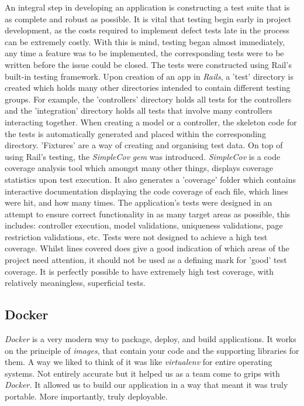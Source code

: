 \documentclass{l3proj}
\begin{document}
An integral step in developing an application is constructing a test suite that is as complete and robust as possible. It is vital that testing begin early in project development, as the costs required to implement defect tests late in the process can be extremely costly. With this is mind, testing began almost immediately, any time a feature was to be implemented, the corresponding tests were to be written before the issue could be closed. The tests were constructed using Rail's built-in testing framework. Upon creation of an app in \textit{Rails}, a 'test' directory is created which holds many other directories intended to contain different testing groups. For example, the 'controllers' directory holds all tests for the controllers and the 'integration' directory holds all tests that involve many controllers interacting together. When creating a model or a controller, the skeleton code for the tests is automatically generated and placed within the corresponding directory. 'Fixtures' are a way of creating and organising test data. On top of using Rail's testing, the \textit{SimpleCov} \textit{gem} was introduced. \textit{SimpleCov} is a code coverage analysis tool which amongst many other things, displays coverage statistics upon test execution. It also generates a 'coverage' folder which contains interactive documentation displaying the code coverage of each file, which lines were hit, and how many times. The application's tests were designed in an attempt to ensure correct functionality in as many target areas as possible, this includes: controller execution, model validations, uniqueness validations, page restriction validations, etc. Tests were not designed to achieve a high test coverage. Whilst lines covered does give a good indication of which areas of the project need attention, it should not be used as a defining mark for 'good' test coverage. It is perfectly possible to have extremely high test coverage, with relatively meaningless, superficial tests.


\subsection{Docker}
\label{sec:docker}

\textit{Docker}\cite{what-is-docker} is a very modern way to package, deploy, and build applications. It works on the principle of \textit{images}, that contain your code and the supporting libraries for them. A way we liked to think of it was like \textit{virtualenv} for entire operating systems. Not entirely accurate but it helped us as a team come to grips with \textit{Docker.} It allowed us to build our application in a way that meant it was truly portable. More importantly, truly deployable.
\end{document}
